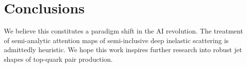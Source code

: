\section{Conclusions}\label{sec:conclusions}

We believe this constitutes a paradigm shift in the AI revolution. The
treatment of semi-analytic attention maps of semi-inclusive deep
inelastic scattering is admittedly heuristic. We hope this work inspires
further research into robust jet shapes of top-quark pair production.

